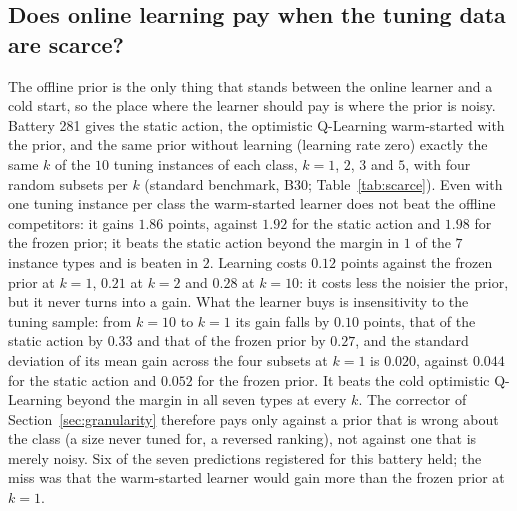 


\subsection{Does online learning pay when the tuning data are scarce?}
\label{sec:scarce}
The offline prior is the only thing that stands between the online learner and a cold start, so the place where the learner should pay is where the prior is noisy. Battery 281 gives the static action, the optimistic Q-Learning warm-started with the prior, and the same prior without learning (learning rate zero) exactly the same $k$ of the $10$ tuning instances of each class, $k=1$, $2$, $3$ and $5$, with four random subsets per $k$ (standard benchmark, B30; Table~\ref{tab:scarce}). Even with one tuning instance per class the warm-started learner does not beat the offline competitors: it gains $1.86$ points, against $1.92$ for the static action and $1.98$ for the frozen prior; it beats the static action beyond the margin in $1$ of the $7$ instance types and is beaten in $2$. Learning costs $0.12$ points against the frozen prior at $k=1$, $0.21$ at $k=2$ and $0.28$ at $k=10$: it costs less the noisier the prior, but it never turns into a gain. What the learner buys is insensitivity to the tuning sample: from $k=10$ to $k=1$ its gain falls by $0.10$ points, that of the static action by $0.33$ and that of the frozen prior by $0.27$, and the standard deviation of its mean gain across the four subsets at $k=1$ is $0.020$, against $0.044$ for the static action and $0.052$ for the frozen prior. It beats the cold optimistic Q-Learning beyond the margin in all seven types at every $k$. The corrector of Section~\ref{sec:granularity} therefore pays only against a prior that is wrong about the class (a size never tuned for, a reversed ranking), not against one that is merely noisy. Six of the seven predictions registered for this battery held; the miss was that the warm-started learner would gain more than the frozen prior at $k=1$.


